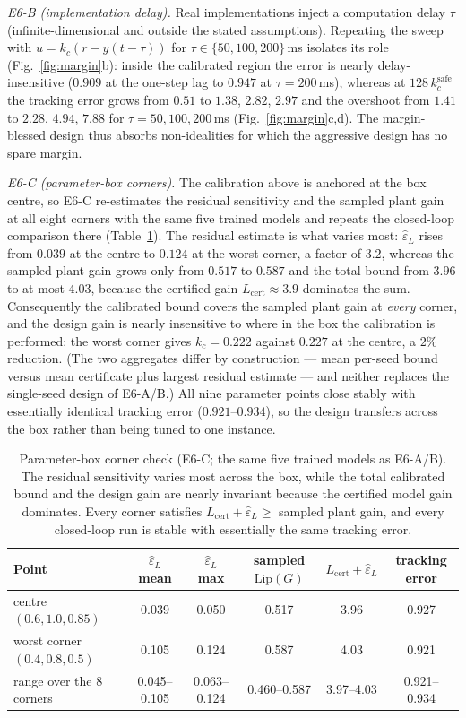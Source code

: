 \documentclass[11pt]{article}
\newcommand{\Lhat}{L_{\mathrm{cert}}}
\newcommand{\epsL}{\varepsilon_L}
\begin{document}
\emph{E6-B (implementation delay).} Real implementations inject a computation
delay $\tau$ (infinite-dimensional and outside the stated assumptions).
Repeating the sweep with $u=k_c(r-y(t-\tau))$ for $\tau\in\{50,100,200\}$\,ms isolates
its role (Fig.~\ref{fig:margin}b): inside the calibrated region the error is
nearly delay-insensitive ($0.909$ at the one-step lag to $0.947$ at
$\tau=200$\,ms), whereas at $128\,k_c^{\mathrm{safe}}$ the tracking error
grows from $0.51$ to $1.38$, $2.82$, $2.97$ and the overshoot from $1.41$ to
$2.28$, $4.94$, $7.88$ for $\tau=50,100,200$\,ms
(Fig.~\ref{fig:margin}c,d). The margin-blessed design thus absorbs
non-idealities for which the aggressive design has no spare margin.

\emph{E6-C (parameter-box corners).} The calibration above is anchored at
the box centre, so E6-C re-estimates the residual sensitivity and the sampled
plant gain at all eight corners with the same five trained models and repeats
the closed-loop comparison there (Table~\ref{tab:e6c}). The residual estimate
is what varies most: $\hat\epsL$ rises from $0.039$ at the centre to $0.124$
at the worst corner, a factor of $3.2$, whereas the sampled plant gain grows
only from $0.517$ to $0.587$ and the total bound from $3.96$ to at most
$4.03$, because the certified gain $\Lhat\approx3.9$ dominates the sum.
Consequently the calibrated bound covers the sampled plant gain at
\emph{every} corner, and the design gain is nearly insensitive to where in the
box the calibration is performed: the worst corner gives $k_c=0.222$ against
$0.227$ at the centre, a $2\%$ reduction. (The two aggregates differ by
construction --- mean per-seed bound versus mean certificate plus largest
residual estimate --- and neither replaces the single-seed design of E6-A/B.) All nine parameter points close
stably with essentially identical tracking error ($0.921$--$0.934$), so the
design transfers across the box rather than being tuned to one instance.

\begin{table}[t]
\centering\small
\caption{Parameter-box corner check (E6-C; the same five trained models as
E6-A/B). The residual sensitivity varies most across the box, while the total
calibrated bound and the design gain are nearly invariant because the
certified model gain dominates. Every corner satisfies
$\Lhat+\hat\epsL\ge$ sampled plant gain, and every closed-loop run is stable
with essentially the same tracking error.}
\label{tab:e6c}
\begin{tabular}{lccccc}
\toprule
Point & $\hat\epsL$ mean & $\hat\epsL$ max & sampled $\mathrm{Lip}(G)$ & $\Lhat+\hat\epsL$ & tracking error \\
\midrule
centre $(0.6,1.0,0.85)$        & 0.039 & 0.050 & 0.517 & 3.96 & 0.927 \\
worst corner $(0.4,0.8,0.5)$   & 0.105 & 0.124 & 0.587 & 4.03 & 0.921 \\
\multicolumn{1}{l}{range over the 8 corners} & 0.045--0.105 & 0.063--0.124 & 0.460--0.587 & 3.97--4.03 & 0.921--0.934 \\
\bottomrule
\end{tabular}
\end{table}
\end{document}
